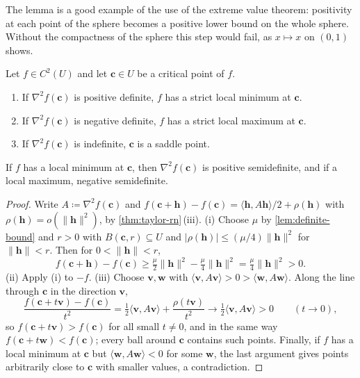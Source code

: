 The lemma is a good example of the use of the extreme value theorem: positivity at each point of the sphere becomes a positive lower bound on the whole sphere. Without the compactness of the sphere this step would fail, as $x\mapsto x$ on $(0,1)$ shows.

\begin{theorem}
\label{thm:second-derivative-test-rn}
Let $f\in C^2(U)$ and let $\mathbf c\in U$ be a critical point of $f$.
\begin{enumerate}
\item If $\nabla^2f(\mathbf c)$ is positive definite, $f$ has a strict local minimum at $\mathbf c$.
\item If $\nabla^2f(\mathbf c)$ is negative definite, $f$ has a strict local maximum at $\mathbf c$.
\item If $\nabla^2f(\mathbf c)$ is indefinite, $\mathbf c$ is a saddle point.
\end{enumerate}
If $f$ has a local minimum at $\mathbf c$, then $\nabla^2f(\mathbf c)$ is positive semidefinite, and if a local maximum, negative semidefinite.
\end{theorem}

\begin{proof}
Write $A\coloneqq\nabla^2f(\mathbf c)$ and $f(\mathbf c+\mathbf h)-f(\mathbf c)=\langle\mathbf h,A\mathbf h\rangle/2+\rho(\mathbf h)$ with $\rho(\mathbf h)=o(\|\mathbf h\|^2)$, by \cref{thm:taylor-rn}\,(iii). (i) Choose $\mu$ by \cref{lem:definite-bound} and $r>0$ with $B(\mathbf c,r)\subseteq U$ and $|\rho(\mathbf h)|\le(\mu/4)\|\mathbf h\|^2$ for $\|\mathbf h\|<r$. Then for $0<\|\mathbf h\|<r$,
\[
f(\mathbf c+\mathbf h)-f(\mathbf c)\ge\tfrac\mu2\|\mathbf h\|^2-\tfrac\mu4\|\mathbf h\|^2=\tfrac\mu4\|\mathbf h\|^2>0 .
\]
(ii) Apply (i) to $-f$. (iii) Choose $\mathbf v,\mathbf w$ with $\langle\mathbf v,A\mathbf v\rangle>0>\langle\mathbf w,A\mathbf w\rangle$. Along the line through $\mathbf c$ in the direction $\mathbf v$,
\[
\frac{f(\mathbf c+t\mathbf v)-f(\mathbf c)}{t^2}=\tfrac12\langle\mathbf v,A\mathbf v\rangle+\frac{\rho(t\mathbf v)}{t^2}\to\tfrac12\langle\mathbf v,A\mathbf v\rangle>0\qquad(t\to0),
\]
so $f(\mathbf c+t\mathbf v)>f(\mathbf c)$ for all small $t\ne0$, and in the same way $f(\mathbf c+t\mathbf w)<f(\mathbf c)$; every ball around $\mathbf c$ contains such points. Finally, if $f$ has a local minimum at $\mathbf c$ but $\langle\mathbf w,A\mathbf w\rangle<0$ for some $\mathbf w$, the last argument gives points arbitrarily close to $\mathbf c$ with smaller values, a contradiction.
\end{proof}

